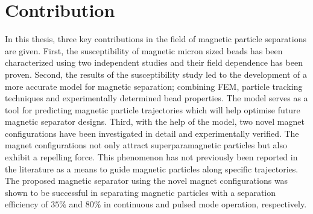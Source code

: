 \section{Contribution}\label{sec:contribution}
In this thesis, three key contributions in the field of magnetic particle separations are given. First, the susceptibility of magnetic micron sized beads has been characterized using two independent studies and their field dependence has been proven. Second, the results of the susceptibility study led to the development of a more accurate model for magnetic separation; combining FEM, particle tracking techniques and experimentally determined bead properties. The model serves as a tool for predicting magnetic particle trajectories which will help optimise future magnetic separator designs. Third, with the help of the model, two novel magnet configurations have been investigated in detail and experimentally verified. The magnet configurations not only attract superparamagnetic particles but also exhibit a repelling force. This phenomenon has not previously been reported in the literature as a means to guide magnetic particles along specific trajectories. The proposed magnetic separator using the novel magnet configurations was shown to be successful in separating magnetic particles with a separation efficiency of $35\%$ and $80\%$ in continuous and pulsed mode operation, respectively.


%
